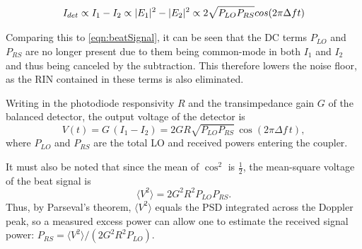 \begin{equation}
	I_{det} \propto I_1 - I_2 \propto |E_1|^2 - |E_2|^2 \newline
	\propto 2\sqrt{P_{LO}P_{RS}} cos(2\pi\Delta f t)
\end{equation}

Comparing this to \autoref{eqn:beatSignal}, it can be seen that the DC terms $P_{LO}$ and $P_{RS}$ are no longer present due to them being common-mode in both $I_1$ and $I_2$ and thus being canceled by the subtraction. This therefore lowers the noise floor, as the RIN contained in these terms is also eliminated. 

Writing in the photodiode responsivity $R$ and the transimpedance gain $G$ of
the balanced detector, the output voltage of the detector is
\begin{equation}
	V(t) = G\,(I_1 - I_2) = 2GR\sqrt{P_{LO}P_{RS}}\,\cos(2\pi\Delta f\,t),
	\label{eq:beat_voltage}
\end{equation}
where $P_{LO}$ and $P_{RS}$ are the total LO and received powers entering the
coupler. 

It must also be noted that since the mean of $\cos^2$ is $\tfrac{1}{2}$, the mean-square voltage of the beat signal is
\begin{equation}
	\langle V^2 \rangle = 2G^2R^2P_{LO}P_{RS}.
	\label{eq:beat_power}
\end{equation}
Thus, by Parseval's theorem, $\langle V^2 \rangle$ equals the PSD integrated across
the Doppler peak, so a measured excess power can allow one to estimate the received signal power:
$P_{RS} = \langle V^2 \rangle / (2G^2R^2P_{LO})$. 


